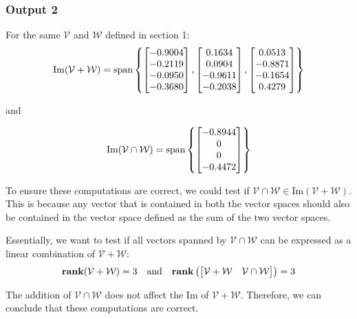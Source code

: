 \documentclass[10pt]{article}
\begin{document}
\subsubsection{Output 2}
For the same $\mathcal{V}$ and $\mathcal{W}$ defined in section 1:
\begin{equation*}
    \text{Im}({\mathcal{V} + \mathcal{W}}) = \text{span}
    \begin{Bmatrix}
        \begin{bmatrix} -0.9004\\-0.2119\\-0.0950\\-0.3680 \end{bmatrix},
        \begin{bmatrix} 0.1634\\0.0904\\-0.9611\\-0.2038 \end{bmatrix},
        \begin{bmatrix} 0.0513\\-0.8871\\-0.1654\\0.4279 \end{bmatrix}
    \end{Bmatrix}
\end{equation*}
\begin{center}
    and
\end{center}
\begin{equation*}
    \text{Im}({\mathcal{V} \cap \mathcal{W}}) = \text{span}
    \begin{Bmatrix}
        \begin{bmatrix} -0.8944\\0\\0\\-0.4472 \end{bmatrix}
    \end{Bmatrix}
\end{equation*}

To ensure these computations are correct, we could test if ${\mathcal{V} \cap \mathcal{W}} \in \text{Im}({\mathcal{V} + \mathcal{W}})$. This is because any vector that is contained in both the vector spaces should also be contained in the vector space defined as the sum of the two vector spaces.

Essentially, we want to test if all vectors spanned by ${\mathcal{V} \cap \mathcal{W}}$ can be expressed as a linear combination of $\mathcal{V} + \mathcal{W}$:
\begin{equation*}
    \mathbf{rank}(\mathcal{V} + \mathcal{W}) = 3
    \quad
    \text{and}
    \quad
    \mathbf{rank}\left(\begin{bmatrix} \mathcal{V} + \mathcal{W} & \mathcal{V} \cap \mathcal{W} \end{bmatrix}\right) = 3
\end{equation*}

The addition of $\mathcal{V} \cap \mathcal{W}$ does not affect the $\text{Im}$ of $\mathcal{V} + \mathcal{W}$. Therefore, we can conclude that these computations are correct.
\end{document}
